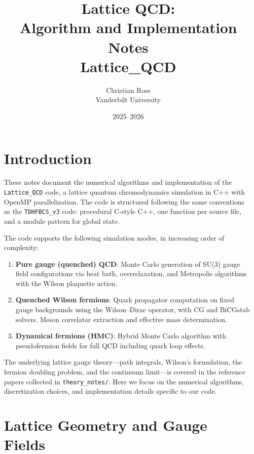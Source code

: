 \documentclass[12pt]{article}
\title{\textbf{Lattice QCD: \\ Algorithm and Implementation Notes} \\ \large Lattice\_QCD}
\author{Christian Ross \\ Vanderbilt University}
\date{2025--2026}
\newcommand{\code}[1]{\texttt{#1}}
\begin{document}
\maketitle
\tableofcontents
\newpage

\section{Introduction}

These notes document the numerical algorithms and implementation of the \code{Lattice\_QCD} code, a lattice quantum chromodynamics simulation in C++ with OpenMP parallelization. The code is structured following the same conventions as the \code{TDHFBCS\_v3} code: procedural C-style C++, one function per source file, and a module pattern for global state.

The code supports the following simulation modes, in increasing order of complexity:
\begin{enumerate}
\item \textbf{Pure gauge (quenched) QCD}: Monte Carlo generation of SU(3) gauge field configurations via heat bath, overrelaxation, and Metropolis algorithms with the Wilson plaquette action.
\item \textbf{Quenched Wilson fermions}: Quark propagator computation on fixed gauge backgrounds using the Wilson--Dirac operator, with CG and BiCGstab solvers. Meson correlator extraction and effective mass determination.
\item \textbf{Dynamical fermions (HMC)}: Hybrid Monte Carlo algorithm with pseudofermion fields for full QCD including quark loop effects.
\end{enumerate}

The underlying lattice gauge theory---path integrals, Wilson's formulation, the fermion doubling problem, and the continuum limit---is covered in the reference papers collected in \code{theory\_notes/}. Here we focus on the numerical algorithms, discretization choices, and implementation details specific to our code.


\section{Lattice Geometry and Gauge Fields}
\label{sec:lattice}
\end{document}

